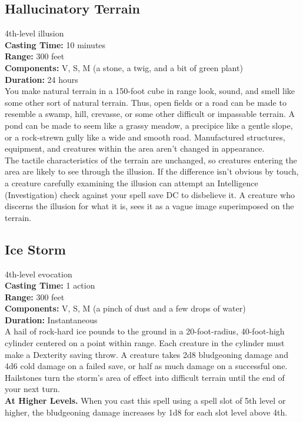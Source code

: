\documentclass[11pt, A4paper, english]{article}
\begin{document}
		\subsection{Hallucinatory Terrain}
4th-level illusion \\
\textbf{Casting Time:} 10 minutes \\
\textbf{Range:} 300 feet \\
\textbf{Components:} V, S, M (a stone, a twig, and a bit of green plant) \\
\textbf{Duration:} 24 hours \\
You make natural terrain in a 150-foot cube in range look, sound, and smell like some other sort of natural terrain. Thus, open fields or a road can be made to resemble a swamp, hill, crevasse, or some other difficult or impassable terrain. A pond can be made to seem like a grassy meadow, a precipice like a gentle slope, or a rock-strewn gully like a wide and smooth road. Manufactured structures, equipment, and creatures within the area aren’t changed in appearance. \\
The tactile characteristics of the terrain are unchanged, so creatures entering the area are likely to see through the illusion. If the difference isn’t obvious by touch, a creature carefully examining the illusion can attempt an Intelligence (Investigation) check against your spell save DC to disbelieve it. A creature who discerns the illusion for what it is, sees it as a vague image superimposed on the terrain.

		\subsection{Ice Storm}
4th-level evocation \\
\textbf{Casting Time:} 1 action \\
\textbf{Range:} 300 feet \\
\textbf{Components:} V, S, M (a pinch of dust and a few drops of water) \\
\textbf{Duration:} Instantaneous \\
A hail of rock-hard ice pounds to the ground in a 20-foot-radius, 40-foot-high cylinder centered on a point within range. Each creature in the cylinder must make a Dexterity saving throw. A creature takes 2d8 bludgeoning damage and 4d6 cold damage on a failed save, or half as much damage on a successful one. \\
Hailstones turn the storm's area of effect into difficult terrain until the end of your next turn. \\
\textbf{At Higher Levels.} When you cast this spell using a spell slot of 5th level or higher, the bludgeoning damage increases by 1d8 for each slot level above 4th.
\end{document}
